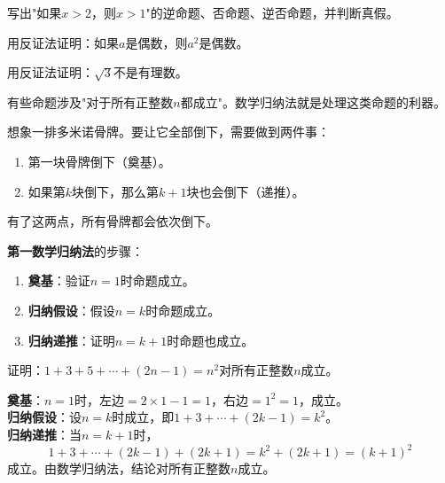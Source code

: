 \begin{exercise}
\item 写出"如果$x>2$，则$x>1$"的逆命题、否命题、逆否命题，并判断真假。
\item 用反证法证明：如果$a$是偶数，则$a^2$是偶数。
\item 用反证法证明：$\sqrt3$不是有理数。
\end{exercise}


有些命题涉及"对于所有正整数$n$都成立"。数学归纳法就是处理这类命题的利器。

想象一排多米诺骨牌。要让它全部倒下，需要做到两件事：
\begin{enumerate}
\item 第一块骨牌倒下（奠基）。
\item 如果第$k$块倒下，那么第$k+1$块也会倒下（递推）。
\end{enumerate}

有了这两点，所有骨牌都会依次倒下。

\textbf{第一数学归纳法}的步骤：
\begin{enumerate}
\item \textbf{奠基}：验证$n=1$时命题成立。
\item \textbf{归纳假设}：假设$n=k$时命题成立。
\item \textbf{归纳递推}：证明$n=k+1$时命题也成立。
\end{enumerate}

\begin{example}
证明：$1+3+5+\cdots+(2n-1)=n^2$对所有正整数$n$成立。
\end{example}
\begin{solution}
\textbf{奠基}：$n=1$时，左边$=2\times1-1=1$，右边$=1^2=1$，成立。\\
\textbf{归纳假设}：设$n=k$时成立，即$1+3+\cdots+(2k-1)=k^2$。\\
\textbf{归纳递推}：当$n=k+1$时，
\[
1+3+\cdots+(2k-1)+(2k+1) = k^2+(2k+1) = (k+1)^2
\]
成立。由数学归纳法，结论对所有正整数$n$成立。
\end{solution}

